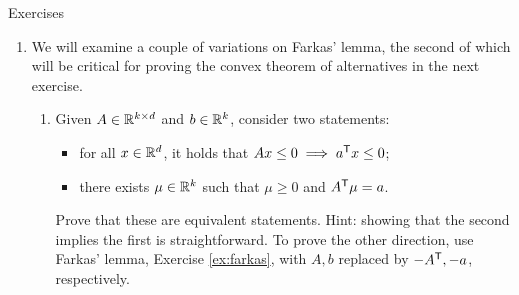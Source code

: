 \begin{xcb}{Exercises}
\begin{enumerate}[label=\thechapter.\arabic*]
\begin{enumerate}[label=\alph*.]
\item Let $y \in \R^n$ denote the label vector and $X \in \R^{n \times d}$ the
  feature matrix (whose $i\th$ row is $x_i^\T$), and define . Show that the dual of \eqref{eq:svm_primal} is (equivalent to)      
  \begin{equation}
  \label{eq:svm_dual}
  \begin{alignedat}{2}
  &\maximize_w \quad &&- \frac{1}{2} w^\T \tilde{X} \tilde{X}^\T w + \one^\T w \\ 
  &\st \quad && 0 \leq w \leq C \one \\
  & && y^\T w = 0.
  \end{alignedat}
  \end{equation}

\item Use Slater's condition to show that strong duality always holds between   
  \eqref{eq:svm_primal}, \eqref{eq:svm_dual}.  
\end{enumerate}

\item \label{ex:farkas_variations}
  We will examine a couple of variations on Farkas' lemma, the second of which 
  will be critical for proving the convex theorem of alternatives in the next
  exercise.      

\begin{enumerate}[label=\alph*.]
\item Given $A \in \mathbb{R}^{k \times d}$ and $b \in \mathbb{R}^k$, consider two statements: 
  \begin{itemize}
  \item for all $x \in \mathbb{R}^d$, it holds that $Ax \leq 0 \implies a^{\mathsf{T}} x \leq 0$;  
  \item there exists $\mu \in \mathbb{R}^k$ such that $\mu \geq 0$ and $A^{\mathsf{T}} \mu = 
    a$.
  \end{itemize}
  Prove that these are equivalent statements. Hint: showing that the second  
  implies the first is straightforward. To prove the other direction, use
  Farkas' lemma, Exercise \ref{ex:farkas}, with $A,b$ replaced by $-A^{\mathsf{T}}, -a$,
  respectively.        


\end{enumerate}
\end{enumerate}
\end{xcb}
